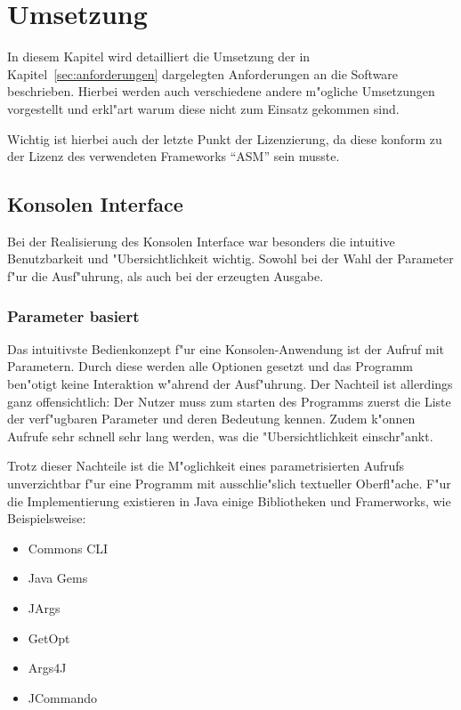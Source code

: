 
\chapter{Umsetzung}

In diesem Kapitel wird detailliert die Umsetzung der in Kapitel~\ref{sec:anforderungen} dargelegten Anforderungen an die Software beschrieben. Hierbei werden auch verschiedene andere m"ogliche Umsetzungen vorgestellt und erkl"art warum diese nicht zum Einsatz gekommen sind.

Wichtig ist hierbei auch der letzte Punkt der Lizenzierung, da diese konform zu der Lizenz des verwendeten Frameworks "`ASM"' sein musste.

\section{Konsolen Interface}
\label{sec:console}

Bei der Realisierung des Konsolen Interface war besonders die intuitive Benutzbarkeit und "Ubersichtlichkeit wichtig. Sowohl bei der Wahl der Parameter f"ur die Ausf"uhrung, als auch bei der erzeugten Ausgabe.

\subsection{Parameter basiert}

Das intuitivste Bedienkonzept f"ur eine Konsolen-Anwendung ist der Aufruf mit Parametern. Durch diese werden alle Optionen gesetzt und das Programm ben"otigt keine Interaktion w"ahrend der Ausf"uhrung. Der Nachteil ist allerdings ganz offensichtlich: Der Nutzer muss zum starten des Programms zuerst die Liste der verf"ugbaren Parameter und deren Bedeutung kennen. Zudem k"onnen Aufrufe sehr schnell sehr lang werden, was die "Ubersichtlichkeit einschr"ankt.

Trotz dieser Nachteile ist die M"oglichkeit eines parametrisierten Aufrufs unverzichtbar f"ur eine Programm mit ausschlie"slich textueller Oberfl"ache. F"ur die Implementierung existieren in Java einige Bibliotheken und Framerworks, wie Beispielsweise:
\begin{itemize}
	\item Commons CLI
	\item Java Gems
	\item JArgs
	\item GetOpt
	\item Args4J
	\item JCommando
\end{itemize}

